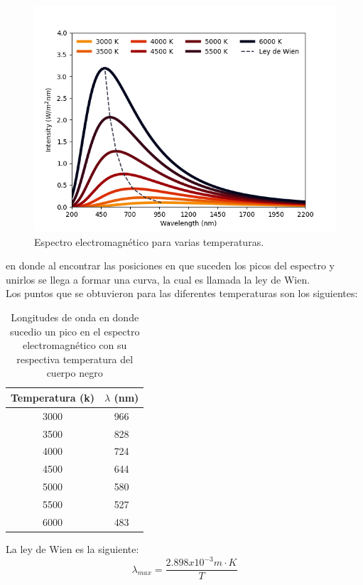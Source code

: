 \documentclass[12pt,letterpaper]{article}
\begin{document}
\begin{multicols}{2}
\begin{figure}[H]
\includegraphics[scale=0.45]{../Graphics/black_body.png}
\caption{Espectro electromagnético para varias temperaturas.}
\label{dif_temp}
\end{figure}
en donde al encontrar las posiciones en que suceden los picos del espectro y unirlos se llega a formar una curva, la cual es llamada la ley de Wien. \\
Los puntos que se obtuvieron para las diferentes temperaturas son los siguientes:
\begin{table}[H]
    \centering
    \begin{tabular}{c|c}
        \hline
        Temperatura (k) & $\lambda$ (nm) \\ \hline
        3000 & 966 \\
        3500 & 828 \\ 
        4000 & 724 \\
        4500 & 644 \\ 
        5000 & 580 \\ 
        5500 & 527 \\ 
        6000 & 483 \\ \hline
    \end{tabular}
    \caption{Longitudes de onda en donde sucedio un pico en el espectro electromagnético con su respectiva temperatura del cuerpo negro}
    \label{datos de wien}
\end{table}
La ley de Wien es la siguiente:
\begin{equation}
    \lambda_{max}= \frac{2.898x10^{-3} m\cdot K}{T}
    \label{ley de wein}
\end{equation}

\end{multicols}
\end{document}
